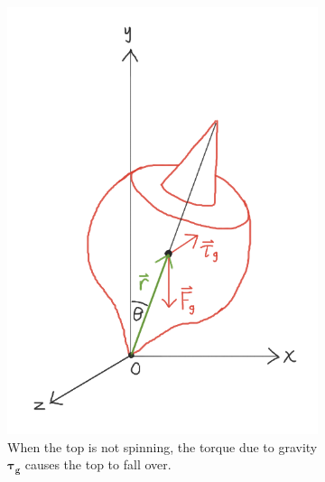 \documentclass{article}
\begin{document}
\begin{figure}[h]
    \hspace*{\fill}
     \begin{subfigure}[t]{0.4\textwidth}
         \includegraphics[width=\textwidth]{img/top (1).png}
         \caption{When the top is not spinning, the torque due to gravity $\pmb{\tau_g}$ causes the top to fall over.}
         \label{top1}
     \end{subfigure}
     \hfill
     \begin{subfigure}[t]{0.4\textwidth}

\end{subfigure}
\end{figure}
\end{document}
